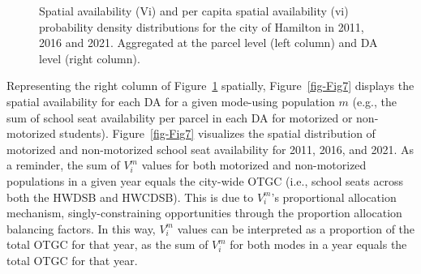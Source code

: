 \documentclass[
default
]{sn-jnl}
\begin{document}
\begin{figure}[H]


\caption{\label{fig-Fig6}Spatial availability (Vi) and per capita
spatial availability (vi) probability density distributions for the city
of Hamilton in 2011, 2016 and 2021. Aggregated at the parcel level (left
column) and DA level (right column).}

\end{figure}%

Representing the right column of Figure~\ref{fig-Fig6} spatially,
Figure~\ref{fig-Fig7} displays the spatial availability for each DA for
a given mode-using population \(m\) (e.g., the sum of school seat
availability per parcel in each DA for motorized or non-motorized
students). Figure~\ref{fig-Fig7} visualizes the spatial distribution of
motorized and non-motorized school seat availability for 2011, 2016, and
2021. As a reminder, the sum of \(V_i^m\) values for both motorized and
non-motorized populations in a given year equals the city-wide OTGC
(i.e., school seats across both the HWDSB and HWCDSB). This is due to
\(V_i^m\)'s proportional allocation mechanism, singly-constraining
opportunities through the proportion allocation balancing factors. In
this way, \(V_i^m\) values can be interpreted as a proportion of the
total OTGC for that year, as the sum of \(V_i^m\) for both modes in a
year equals the total OTGC for that year.
\end{document}
